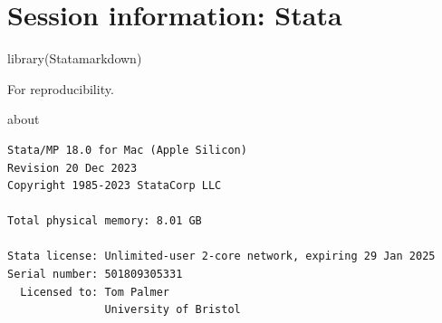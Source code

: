 \documentclass[
  10pt,
  a4paper,
]{book}
\newenvironment{Shaded}{\begin{snugshade}}{\end{snugshade}}
\newcommand{\FunctionTok}[1]{\textcolor[rgb]{0.28,0.35,0.67}{#1}}
\newcommand{\NormalTok}[1]{\textcolor[rgb]{0.00,0.46,0.62}{#1}}
\begin{document}
\chapter*{Session information: Stata}\label{session-information-stata}

\begin{Shaded}
\begin{Highlighting}[]
\FunctionTok{library}\NormalTok{(Statamarkdown)}
\end{Highlighting}
\end{Shaded}

For reproducibility.

\begin{Shaded}
\begin{Highlighting}[]
\NormalTok{about}
\end{Highlighting}
\end{Shaded}

\begin{verbatim}
Stata/MP 18.0 for Mac (Apple Silicon)
Revision 20 Dec 2023
Copyright 1985-2023 StataCorp LLC

Total physical memory: 8.01 GB

Stata license: Unlimited-user 2-core network, expiring 29 Jan 2025
Serial number: 501809305331
  Licensed to: Tom Palmer
               University of Bristol
\end{verbatim}
\end{document}
